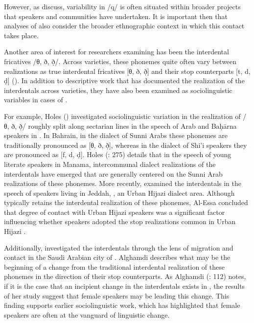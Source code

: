\documentclass[output=paper]{langsci/langscibook}
\begin{document}
However, as \citet{CotterHoresh2015} discuss, variability in /q/ is often situated within broader  projects that speakers and communities have undertaken. It is important then that analyses of   also consider the broader ethnographic context in which this contact takes place. 

Another area of interest for researchers examining  has been the interdental fricatives /θ, ð, ð̣/. Across  varieties, these phonemes quite often vary between realizations as true interdental fricatives [θ, ð, ð̣] and their stop counterparts [t, d, ḍ] (\citealt{Al-Wer1997,Al-Wer2003daad,Al-Wer2011}). In addition to descriptive work that has documented the realization of the interdentals across  varieties, they have also been examined as sociolinguistic variables in cases of . 

  For example, Holes (\citeyear{Holes1987,Holes1995}) investigated sociolinguistic variation in the realization of /θ, ð, ð̣/ roughly split along sectarian lines in the speech of Arab and Baḥārna speakers in . In Bahrain, in the dialect of Sunni Arabs these phonemes are traditionally pronounced as [θ, ð, ð̣], whereas in the dialect of Shi’i speakers they are pronounced as [f, d, ḍ]. Holes (\citeyear{Holes1995}: 275) details that in the speech of young literate speakers in Manama, intercommunal dialect realizations of the interdentals have emerged that are generally centered on the Sunni Arab realizations of these phonemes. More recently, \citet{Al-Essa2008} examined the interdentals in the speech of   speakers living in Jeddah, , an Urban Hijazi  dialect area. Although   typically retains the interdental realization of these phonemes, Al-Essa concluded that degree of contact with Urban Hijazi speakers was a significant factor influencing whether  speakers adopted the stop realizations common in Urban Hijazi . 

Additionally, \citet{Alghamdi2014} investigated the interdentals through the lens of migration and contact in the Saudi Arabian city of . Alghamdi describes what may be the beginning of a change from the traditional interdental realization of these phonemes in the direction of their stop counterparts. As Alghamdi (\citeyear{Alghamdi2014}: 112) notes, if it is the case that an incipient change in the interdentals exists in , the results of her study suggest that female speakers may be leading this change. This finding supports earlier sociolinguistic work, which has highlighted that female speakers are often at the vanguard of linguistic change. 
\end{document}
